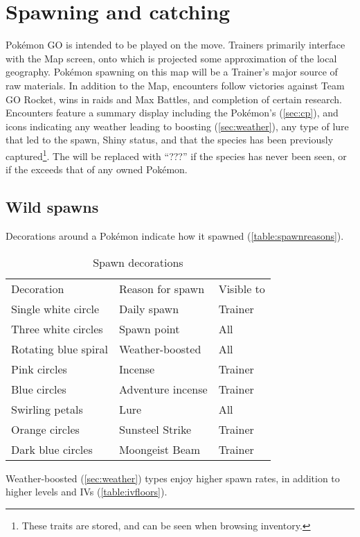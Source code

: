 \chapter{Spawning and catching\label{chap:spawn}}
Pokémon GO is intended to be played on the move.
Trainers primarily interface with the Map screen, onto which is projected
  some approximation of the local geography.
Pokémon spawning on this map will be a Trainer's major source of raw materials.
In addition to the Map, encounters follow victories against Team GO Rocket,
  wins in raids and Max Battles, and completion of certain research.
Encounters feature a summary display including the Pokémon's \CP{} (\autoref{sec:cp}),
  and icons indicating any weather leading to boosting (\autoref{sec:weather}),
  any type of lure that led to the spawn,
  Shiny status,
  and that the species has been previously captured\footnote{These traits are stored, and can be seen when browsing inventory.}.
The \CP{} will be replaced with ``???'' if the species has never been seen, or if
  the \CP{} exceeds that of any owned Pokémon.

\section{Wild spawns\label{sec:spawns}}
Decorations around a Pokémon indicate how it spawned (\autoref{table:spawnreasons}).
\begin{table}
\centering
\begin{tabular}{lll}
  Decoration & Reason for spawn & Visible to\\
\Midrule
  Single white circle & Daily spawn & Trainer\\
  Three white circles & Spawn point & All\\
  Rotating blue spiral & Weather-boosted & All\\
  Pink circles & Incense & Trainer\\
  Blue circles & Adventure incense & Trainer\\
  Swirling petals & Lure & All\\
  Orange circles & Sunsteel Strike & Trainer\\
  Dark blue circles & Moongeist Beam & Trainer\\
\end{tabular}
  \caption{Spawn decorations\label{table:spawnreasons}}
\end{table}
Weather-boosted (\autoref{sec:weather}) types enjoy higher spawn rates,
  in addition to higher levels and IVs (\autoref{table:ivfloors}).

